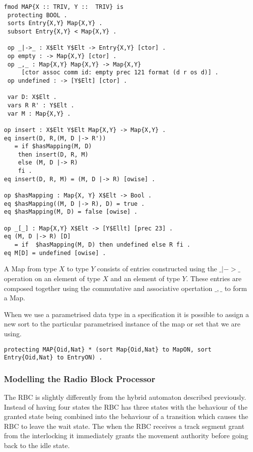\begin{lstlisting}[caption = The specification of the Map data type in Maude]
fmod MAP{X :: TRIV, Y ::  TRIV} is
 protecting BOOL .
 sorts Entry{X,Y} Map{X,Y} .
 subsort Entry{X,Y} < Map{X,Y} .

 op _|->_ : X$Elt Y$Elt -> Entry{X,Y} [ctor] .
 op empty : -> Map{X,Y} [ctor] .
 op _,_ : Map{X,Y} Map{X,Y} -> Map{X,Y} 
     [ctor assoc comm id: empty prec 121 format (d r os d)] .
 op undefined : -> [Y$Elt] [ctor] .

 var D: X$Elt .
 vars R R' : Y$Elt .
 var M : Map{X,Y} .

op insert : X$Elt Y$Elt Map{X,Y} -> Map{X,Y} .
eq insert(D, R,(M, D |-> R'))
   = if $hasMapping(M, D)
    then insert(D, R, M)
    else (M, D |-> R)
    fi .
eq insert(D, R, M) = (M, D |-> R) [owise] .

op $hasMapping : Map{X, Y} X$Elt -> Bool .
eq $hasMapping((M, D |-> R), D) = true .
eq $hasMapping(M, D) = false [owise] .

op _[_] : Map{X,Y} X$Elt -> [Y$Ellt] [prec 23] .
eq (M, D |-> R) [D]
   = if  $hasMapping(M, D) then undefined else R fi .
eq M[D] = undefined [owise] .
\end{lstlisting}
A Map from type $X$ to type $Y$ consists of entries constructed using the $\_|->\_$ operation on an element of type $X$ and an element of type $Y$. These entries are composed together using the commutative and associative opertation $\_,\_$ to form a Map.  

When we use a parametrised data type in a specification it is possible to assign a new sort to the particular parametrised instance of the map or set that we are using.
\begin{center}
\texttt{protecting MAP\{Oid,Nat\}  * (sort Map\{Oid,Nat\} to MapON,
                               sort Entry\{Oid,Nat\} to EntryON) .}
\end{center}




\subsubsection*{Modelling the Radio Block Processor}
The RBC is slightly differently from the hybrid automaton described previously. Instead of having four states the RBC has three states with the behaviour of the granted state being combined into the behaviour of a transition which causes the RBC to leave the wait state. The when the RBC receives a track segment grant from the interlocking it immediately grants the movement authority before going back to the idle state.
 
